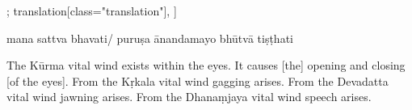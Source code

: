 \begin{alignment}[
  texts=edition[class="edition"];
  translation[class="translation"],
  ]
\begin{edition}
\begin{prose}[p27_01]
mana
sattva
bhavati/ puruṣa ānandamayo bhūtvā tiṣṭhati\dd{}
\end{prose}
  \end{edition}
  \begin{translation}
    \begin{tlate}[p26_02]
\noindent
The Kūrma vital wind exists within the eyes. It causes [the] opening and closing [of the eyes]. From the Kṛkala vital wind gagging arises. From the Devadatta vital wind jawning arises. From the Dhanaṃjaya vital wind speech arises.
\end{tlate}
\begin{tlate}[p27_01]

\end{tlate}
\end{translation}
\end{alignment}
